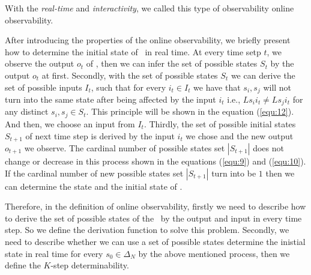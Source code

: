 
With the  {\em real-time} and {\em interactivity}, we called this type of observability online observability.

After introducing the properties of the online observability, we briefly present how to determine the initial state of \BCNs\ in real time. At every time setp $t$, we observe the output $o_t$ of \BCNs, then we can infer the set of possible states $S_t$ by the output $o_t$ at first. %
Secondly, with the set of possible states $S_t$ we can derive the set of possible inputs $I_t$, such that for every $i_t\in I_t$ we have that $s_i, s_j$ will not turn into the same state after being affected by the input $i_t$ i.e., $Ls_i i_t\neq Ls_j i_t$ for any distinct $s_i, s_j\in S_t$. This principle will be shown in the equation (\ref{equ:12}). And then, we choose an input from $I_t$. Thirdly, the set of possible initial states $S_{t+1}$ of next time step is derived by the input $i_t$ we chose and the new output $o_{t+1}$ we observe. The cardinal number of possible states set $|S_{t+1}|$ does not change or decrease in this process shown in the equations (\ref{equ:9}) and (\ref{equ:10}). If the cardinal number of new possible states set $|S_{t+1}|$ turn into be $1$ then we can determine the state and the initial state of \BCN. 

Therefore, in the definition of online observability, firstly we need to describe how to derive the set of possible states of the \BCN\ by the output and input in every time step. So we define the derivation function to solve this problem. Secondly, we need to describe whether we can use a set of possible states determine the inistial state  in real time for every $s_0 \in \Delta_N$ by the above mentioned process, then we define the $K$-step determinability. 

